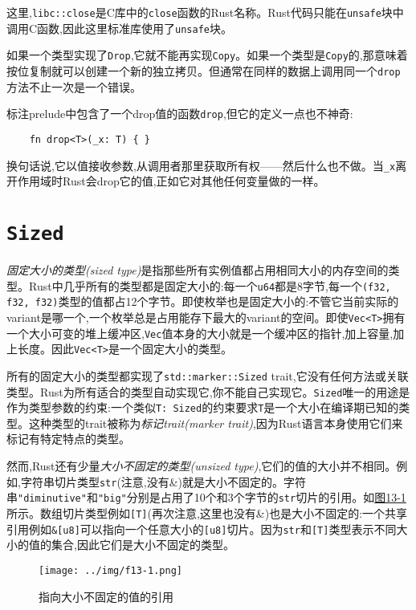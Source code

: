 这里,\texttt{libc::close}是C库中的\texttt{close}函数的Rust名称。Rust代码只能在\texttt{unsafe}块中调用C函数,因此这里标准库使用了\texttt{unsafe}块。

如果一个类型实现了\texttt{Drop},它就不能再实现\texttt{Copy}。如果一个类型是\texttt{Copy}的,那意味着按位复制就可以创建一个新的独立拷贝。但通常在同样的数据上调用同一个\texttt{drop}方法不止一次是一个错误。

标注prelude中包含了一个drop值的函数\texttt{drop},但它的定义一点也不神奇:
\begin{verbatim}
    fn drop<T>(_x: T) { }
\end{verbatim}

换句话说,它以值接收参数,从调用者那里获取所有权——然后什么也不做。当\texttt{\_x}离开作用域时Rust会drop它的值,正如它对其他任何变量做的一样。

\section{\texttt{Sized}}\label{sized}

\emph{固定大小的类型(sized type)}是指那些所有实例值都占用相同大小的内存空间的类型。Rust中几乎所有的类型都是固定大小的:每一个\texttt{u64}都是8字节,每一个\texttt{(f32, f32, f32)}类型的值都占12个字节。即使枚举也是固定大小的:不管它当前实际的variant是哪一个,一个枚举总是占用能存下最大的variant的空间。即使\texttt{Vec<T>}拥有一个大小可变的堆上缓冲区,\texttt{Vec}值本身的大小就是一个缓冲区的指针,加上容量,加上长度。因此\texttt{Vec<T>}是一个固定大小的类型。

所有的固定大小的类型都实现了\texttt{std::marker::Sized} trait,它没有任何方法或关联类型。Rust为所有适合的类型自动实现它,你不能自己实现它。\texttt{Sized}唯一的用途是作为类型参数的约束:一个类似\texttt{T: Sized}的约束要求\texttt{T}是一个大小在编译期已知的类型。这种类型的trait被称为\emph{标记trait(marker trait)},因为Rust语言本身使用它们来标记有特定特点的类型。

然而,Rust还有少量\emph{大小不固定的类型(unsized type)},它们的值的大小并不相同。例如,字符串切片类型\texttt{str}(注意,没有\&)就是大小不固定的。字符串\texttt{"diminutive"}和\texttt{"big"}分别是占用了10个和3个字节的\texttt{str}切片的引用。如\hyperref[f13-1]{图13-1}所示。数组切片类型例如\texttt{[T]}(再次注意,这里也没有\&)也是大小不固定的:一个共享引用例如\texttt{\&[u8]}可以指向一个任意大小的\texttt{[u8]}切片。因为\texttt{str}和\texttt{[T]}类型表示不同大小的值的集合,因此它们是大小不固定的类型。

\begin{figure}[htbp]
    \centering
    \texttt{[image: ../img/f13-1.png]}
    \caption{指向大小不固定的值的引用}
    \label{f13-1}
\end{figure}

